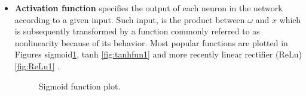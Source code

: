 \begin{itemize}
\item \textbf{Activation function} specifies the output of each neuron in the network according to a given input. Such input, is the product between $\omega$ and $x$ which is subsequently transformed by a function commonly referred to as nonlinearity because of its behavior. Most popular functions are plotted in Figures  sigmoid\ref{fig:Sigfun1}, tanh \ref{fig:tanhfun1} and more recently linear rectifier (ReLu) \ref{fig:ReLu1} \cite{glorot2011deep}. 

\begin{figure}[tb] 
\centering 
{}
\caption{Sigmoid function plot.}
\label{fig:Sigfun1} 
\end{figure}


\end{itemize}
